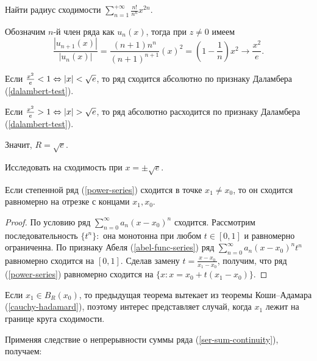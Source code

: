
\begin{example}
    Найти радиус сходимости $\sum_{n=1}^{+\infty} \frac{n!}{n^n}x^{2n}$.
\end{example}

\begin{solution}
    Обозначим $n$-й член ряда как $u_{n}(x)$, тогда при $z \neq 0$ имеем
    \[\frac{|u_{n+1}(x)|}{|u_{n}(x)|} = \frac{(n + 1) n^{n}}{(n + 1)^{n + 1}}(x)^{2} = (1 - \frac{1}{n})x^{2} \to \frac{x^{2}}{e}.\]

    Если $\frac{x^{2}}{e} < 1 \Leftrightarrow |x| < \sqrt{e}$, то ряд сходится абсолютно по признаку Даламбера (\ref{dalambert-test}).
    
    Если $\frac{x^{2}}{e} > 1 \Leftrightarrow |x| > \sqrt{e}$, то ряд абсолютно расходится по признаку Даламбера (\ref{dalambert-test}).

    Значит, $R = \sqrt{e}$.
\end{solution}

\begin{exercise}
    Исследовать на сходимость при $x = \pm \sqrt{e}$.
\end{exercise}

\begin{theorem}[Абель]
    \label{abel-power-series}
    Если степенной ряд (\ref{power-series}) сходится в точке $x_{1} \neq x_{0}$, то он сходится равномерно на отрезке с концами $x_{1}, x_{0}$.
\end{theorem}

\begin{proof}
    По условию ряд $\sum_{n = 0}^\infty a_n (x - x_0)^n$ сходится. Рассмотрим последовательность $\{t^{n}\}:$ она монотонна при любом $t \in [0, 1]$ и равномерно ограниченна. По признаку Абеля (\ref{abel-func-series}) ряд $\sum_{n = 0}^\infty a_n (x - x_0)^n t^{n}$ равномерно сходится на $[0, 1]$. Сделав замену $t = \frac{x - x_{0}}{x_{1} - x_{0}}$, получим, что ряд (\ref{power-series}) равномерно сходится на $\{x: x = x_{0} + t(x_{1} - x_{0})\}$.
\end{proof}

\begin{note}
    Если $x_{1} \in B_{R}(x_{0})$, то предыдущая теорема вытекает из теоремы Коши--Адамара (\ref{cauchy-hadamard}), поэтому интерес представляет случай, когда $x_{1}$ лежит на границе круга сходимости.
\end{note}

Применяя следствие о непрерывности суммы ряда (\ref{ser-sum-continuity}), получаем:

